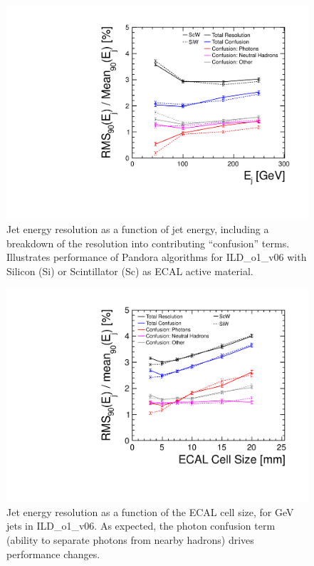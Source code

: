 \begin{figure}
\includegraphics{Software/PandoraPFA/JetEnergyResolution}
\caption{Jet energy resolution as a function of jet energy, including a breakdown of the
resolution into contributing “confusion” terms. Illustrates performance of
Pandora algorithms for ILD\_o1\_v06 with Silicon (Si) or Scintillator (Sc) as ECAL
active material.}
\label{fig:Software:PandoraPFA:JetEnergyResolution}
\end{figure}

\begin{figure}
\includegraphics{Software/PandoraPFA/ECAL_CellSize}
\caption{ Jet energy resolution as a function of the ECAL cell size, for \unit[250]{GeV} jets in
ILD\_o1\_v06. As expected, the photon confusion term (ability to separate photons
from nearby hadrons) drives performance changes.}
\label{fig:Software:PandoraPFA:ECAL_CellSize}
\end{figure}


